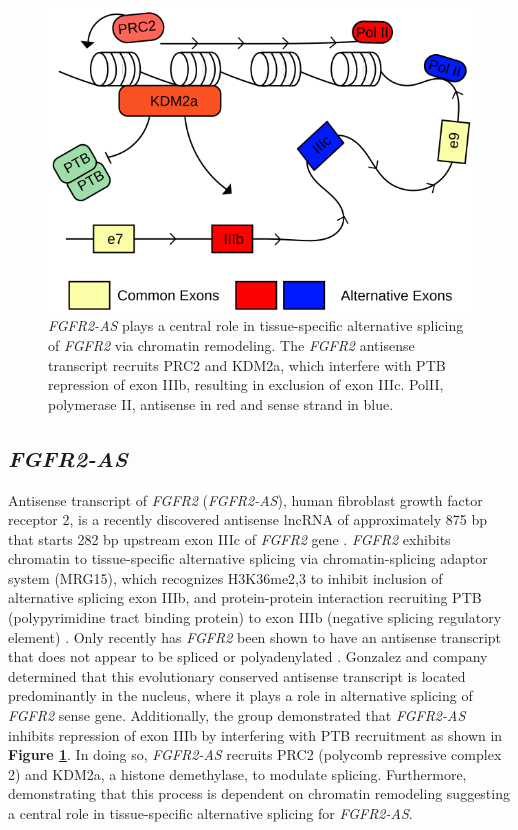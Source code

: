 {%
\begin{figure}[!ht]
\centering
\includegraphics[scale=1]{figures/FGFR2-AS2.pdf}
\caption{\emph{FGFR2-AS} plays a central role in tissue-specific alternative splicing of \emph{FGFR2} via chromatin remodeling. The \emph{FGFR2} antisense transcript recruits PRC2 and KDM2a, which interfere with PTB repression of exon IIIb, resulting in exclusion of exon IIIc. PolII, polymerase II, antisense in red and sense strand in blue.}
\label{Figure 1-5: }
\end{figure}


\subsection{\textit{FGFR2-AS}}

Antisense transcript of \textit{FGFR2} (\textit{FGFR2-AS}), human fibroblast growth factor receptor 2, is a recently discovered antisense lncRNA of approximately 875 bp that starts 282 bp upstream exon IIIc of \textit{FGFR2} gene \cite{Gonzalez2015}. \textit{FGFR2} exhibits chromatin to tissue-specific alternative splicing via chromatin-splicing adaptor system (MRG15), which recognizes H3K36me2,3 to inhibit inclusion of alternative splicing exon IIIb, and protein-protein interaction recruiting PTB (polypyrimidine tract binding protein) to exon IIIb (negative splicing regulatory element) \cite{Luco2010,Zhang2006}. Only recently has \textit{FGFR2} been shown to have an antisense transcript that does not appear to be spliced or polyadenylated \cite{Gonzalez2015}. Gonzalez and company determined that this evolutionary conserved antisense transcript is located predominantly in the nucleus, where it plays a role in alternative splicing of \textit{FGFR2} sense gene. Additionally, the group demonstrated that \textit{FGFR2-AS} inhibits repression of exon IIIb by interfering with PTB recruitment as shown in \textbf{Figure \ref{Figure 1-5: }}. In doing so, \textit{FGFR2-AS} recruits PRC2 (polycomb repressive complex 2) and KDM2a, a histone demethylase, to modulate splicing. Furthermore, demonstrating that this process is dependent on chromatin remodeling suggesting a central role in tissue-specific alternative splicing for \textit{FGFR2-AS}.

}
